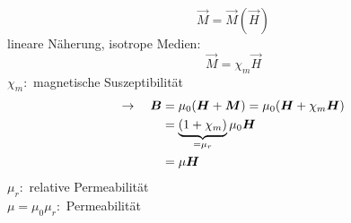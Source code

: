 \begin{equation*}
\vec{M} = \vec{M}(\vec{H})
\end{equation*}
lineare Näherung, isotrope Medien:
\begin{equation*}
\vec{M} = \chi_m \vec{H}
\end{equation*}
$ \chi_m : $ magnetische Suszeptibilität
\begin{align*}
\rightarrow \quad \bm{B} &= \mu_0 (\bm{H} + \bm{M}) = \mu_0 (\bm{H} + \chi_m \bm{H})\\
&= \underbrace{(1 + \chi_m)}_{= \mu_r} \mu_0 \bm{H}\\
&= \mu \bm{H}
\end{align*}
$ \mu_r : $ relative Permeabilität\\
$ \mu = \mu_0 \mu_r : $ Permeabilität